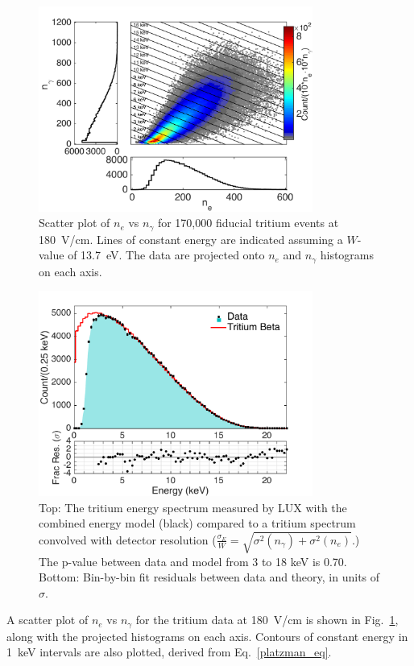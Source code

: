 \begin{figure}[t!]
\includegraphics[width=90mm]{fig4.pdf}
\caption{Scatter plot of $n_e$ vs $n_{\gamma}$ for 170,000 fiducial tritium events at 180~V/cm. Lines of constant energy are indicated assuming a $W$-value of 13.7~eV. The data are projected onto $n_e$ and $n_{\gamma}$ histograms on each axis.}
\label{fig:tritium-scatter}
\end{figure}


\begin{figure}[t!]
\begin{center}
\includegraphics[width=90mm]{fig5.pdf}
\caption{Top: The tritium energy spectrum measured by LUX with the combined energy model (black) compared to  a tritium spectrum convolved with detector resolution  ($\frac{\sigma_E}{W} = \sqrt{\sigma^2(n_{\gamma})+ \sigma^2(n_e)}$.) The p-value between data and model from 3 to 18 keV is 0.70. Bottom: Bin-by-bin fit residuals between data and theory, in units of $\sigma$. }
\label{fig:tritium-spectrum}
\end{center}
\end{figure}


A scatter plot of $n_e$ vs $n_{\gamma}$ for the tritium data at 180~V/cm is shown in Fig.~\ref{fig:tritium-scatter}, along with the projected histograms on each axis. Contours of constant energy in 1~keV intervals are also plotted, derived from Eq.~\ref{platzman_eq}. 

